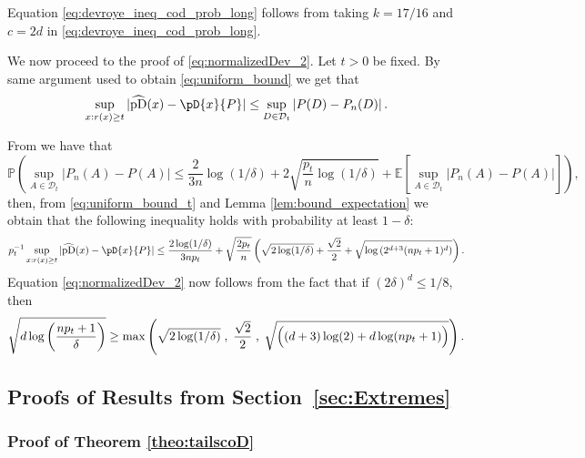 \documentclass{article}
\numberwithin{equation}{section}
\renewcommand{\P}{\mathbb{P}}
\newcommand{\E}{\mathbb{E}}
\newcommand{\coD}[2]{\pD{#1}{#2}}
\begin{document}
    Equation \eqref{eq:devroye_ineq_cod_prob_long} follows from taking
    \(k=17/16\) and \(c=2d\) in \eqref{eq:devroye_ineq_cod_prob_long}.

    We now proceed to the proof of \eqref{eq:normalizedDev_2}. Let \(t>0\) be
    fixed. By same argument used to obtain \eqref{eq:uniform_bound} we get that
    \begin{equation}\label{eq:uniform_bound_t}
        \sup_{x: r(x)\ge t   } |\widehat{\mathrm{pD}}(x) - \coD{x}{P}| \leq
        \sup_{D\in\mathcal{D}_t} \left|P(D)-P_n(D)\right|.
    \end{equation}

    From \cite[Proposition 4.1]{lhaut2022uniform} we have that
    \begin{equation*}
        \P\left( \sup_{A\in\mathcal{D}_t}\left| P_n(A) - P(A) \right|
            \leq \frac{2}{3n}\log(1/\delta) +
            2\sqrt{\frac{p_t}{n}\log(1/\delta)} + \E \left[
        \sup_{A\in\mathcal{D}_t} \left| P_n(A) - P(A) \right|\right] \right),
    \end{equation*}
    then, from \eqref{eq:uniform_bound_t} and Lemma
    \ref{lem:bound_expectation} we obtain that the
    following inequality holds with probability at least \(1-\delta\):
    \begin{equation*}
        p_t^{-1} \sup_{x: r(x)\ge t   } |\widehat{\mathrm{pD}}(x) - \coD{x}{P}| \leq
        \frac{2\log(1/\delta)}{3np_t} + \sqrt{\frac{2p_t}{n}}\left(
            \sqrt{2\log(1/\delta)} + \frac{\sqrt{2}}{2}+
        \sqrt{\log{\left(2^{d+3}(np_t+1)^d\right)}} \right).
    \end{equation*}
    Equation \eqref{eq:normalizedDev_2} now follows from the fact that
    if \((2\delta)^{d}\leq 1/8\), then
    \begin{equation*}
        \sqrt{d\log\left(\frac{np_t+1}{\delta}\right)} \geq
        \max\left(\sqrt{ 2\log(1/\delta)}\;,\; \frac{\sqrt{2}}{2}\;,\;
        \sqrt{\Bigl( (d+3)\log(2) + d\log(np_t+1) \Bigr)} \right).
    \end{equation*}


\subsection{Proofs of Results from Section~\ref{sec:Extremes}}

\subsubsection{Proof of Theorem \ref{theo:tailscoD}}
\end{document}
